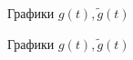 \documentclass[12pt,a4paper]{article}
\begin{document}
  
   \begin{figure}[h!]
\caption{   Графики $g(t), \tilde g (t)  $ }
\label{fig:image}
\end{figure}

  \begin{figure}[h!]
\caption{   Графики $g(t), \tilde g (t)  $ }
\label{fig:image}
\end{figure}
\end{document}
